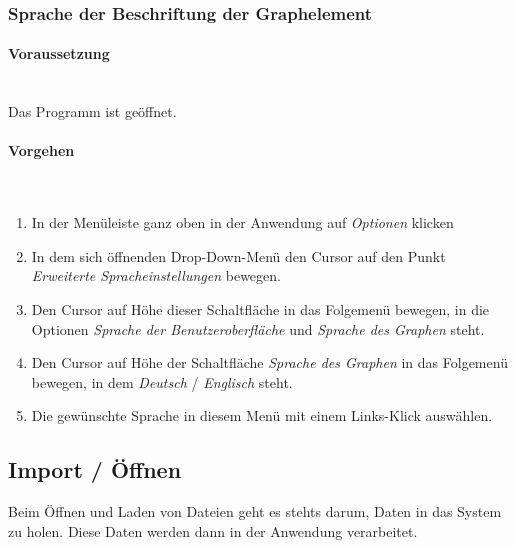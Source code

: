 \documentclass[enabledeprecatedfontcommands,fontsize=11pt,paper=a4,twoside]{scrartcl}
\newcounter{one}
\newcommand*{\condition}{\paragraph{Voraussetzung}$\;$ \vspace{0.2cm}\\}
\newcommand*{\actions}{\paragraph{Vorgehen} $\;$\vspace{0.2cm}\\}
\begin{document}
			\newpage
		\subsubsection{Sprache der Beschriftung der Graphelement}
		\condition 	
		Das Programm ist geöffnet.
		\actions
		\begin{enumerate}
				\item In der Menüleiste ganz oben in der Anwendung auf \textit{Optionen} klicken 
				\item In dem sich öffnenden Drop-Down-Menü den Cursor auf den Punkt \textit{Erweiterte Spracheinstellungen} bewegen.
				\item Den Cursor auf Höhe dieser Schaltfläche in das Folgemenü bewegen, in die Optionen \textit{Sprache der Benutzeroberfläche} und \textit{Sprache des Graphen} steht.
				\item Den Cursor auf Höhe der Schaltfläche \textit{Sprache des Graphen} in das Folgemenü bewegen, in dem \textit{Deutsch} / \textit{Englisch} steht.
				\item Die gewünschte Sprache in diesem Menü mit einem Links-Klick auswählen.
		\end{enumerate}
	 	
							\newpage
	\subsection{Import / Öffnen} \label{import}
	Beim Öffnen und Laden von Dateien geht es stehts darum, Daten in das System zu holen. Diese Daten werden dann in der Anwendung verarbeitet.
	
\end{document}
